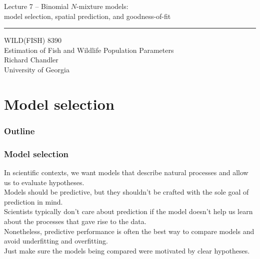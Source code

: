 \documentclass[color=usenames,dvipsnames]{beamer}\usepackage[]{graphicx}\usepackage[]{color}
\begin{document}
\begin{frame}[plain]
  \LARGE
  \centering
  {\LARGE Lecture 7 -- Binomial $N$-mixture models: \\
    model selection, spatial prediction, and goodness-of-fit} \\  
  {\color{default} \rule{\textwidth}{0.1pt}}
  \vfill
  \large
  WILD(FISH) 8390 \\
  Estimation of Fish and Wildlife Population Parameters \\
  \vfill
  \large
  Richard Chandler \\
  University of Georgia \\
\end{frame}





\section{Model selection}



\begin{frame}[plain]
  \frametitle{Outline}
  \Large
\end{frame}





\begin{frame}
  \frametitle{Model selection}
  In scientific contexts, we want models that describe natural
  processes and allow us to evaluate hypotheses. \\
  \pause
  \vfill
  Models should be predictive, but they shouldn't be crafted with the
  sole goal of prediction in mind. \\
  \pause
  \vfill
  Scientists typically don't care about prediction if the model
  doesn't help us learn about the processes that gave rise to the
  data. \\  
  \pause
  \vfill
  Nonetheless, predictive performance is often the best way
  to compare models and avoid underfitting and overfitting. \\
  \pause
  \vfill
  Just make sure the models being compared were motivated by clear
  hypotheses.
\end{frame}
\end{document}
